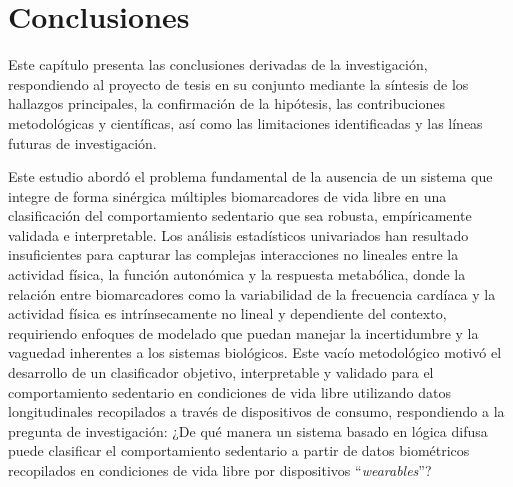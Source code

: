 \chapter{Conclusiones}
\label{chap:conclusiones}

\noindent Este capítulo presenta las conclusiones derivadas de la investigación, respondiendo al proyecto de tesis en su conjunto mediante la síntesis de los hallazgos principales, la confirmación de la hipótesis, las contribuciones metodológicas y científicas, así como las limitaciones identificadas y las líneas futuras de investigación.


Este estudio abordó el problema fundamental de la ausencia de un sistema que integre de forma sinérgica múltiples biomarcadores de vida libre en una clasificación del comportamiento sedentario que sea robusta, empíricamente validada e interpretable. Los análisis estadísticos univariados han resultado insuficientes para capturar las complejas interacciones no lineales entre la actividad física, la función autonómica y la respuesta metabólica, donde la relación entre biomarcadores como la variabilidad de la frecuencia cardíaca y la actividad física es intrínsecamente no lineal y dependiente del contexto, requiriendo enfoques de modelado que puedan manejar la incertidumbre y la vaguedad inherentes a los sistemas biológicos. Este vacío metodológico motivó el desarrollo de un clasificador objetivo, interpretable y validado para el comportamiento sedentario en condiciones de vida libre utilizando datos longitudinales recopilados a través de dispositivos de consumo, respondiendo a la pregunta de investigación: ¿De qué manera un sistema basado en lógica difusa puede clasificar el comportamiento sedentario a partir de datos biométricos recopilados en condiciones de vida libre por dispositivos ``\textit{wearables}''?


